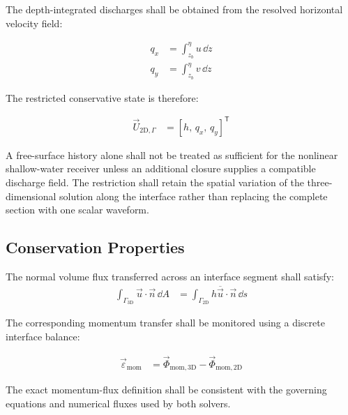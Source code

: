The depth-integrated discharges shall be obtained from the resolved
horizontal velocity field:

\begin{align}
    q_x
    &=
    \int_{z_b}^{\eta}
    u\,\dd z
    \label{eq:res-num-ibc-restricted-discharge-x}
    \\
    q_y
    &=
    \int_{z_b}^{\eta}
    v\,\dd z
    \label{eq:res-num-ibc-restricted-discharge-y}
\end{align}

The restricted conservative state is therefore:

\begin{align}
    \vec{U}_{\mathrm{2D},\Gamma}
    &=
    \left[
        h,\,
        q_x,\,
        q_y
    \right]^{\mathsf{T}}
    \label{eq:res-num-ibc-restricted-conservative-state}
\end{align}

A free-surface history alone shall not be treated as sufficient for the
nonlinear shallow-water receiver unless an additional closure supplies
a compatible discharge field. The restriction shall retain the spatial
variation of the three-dimensional solution along the interface rather
than replacing the complete section with one scalar waveform.

\subsection{Conservation Properties}
\label{sec:res-num-ibc-conservation-properties}


The normal volume flux transferred across an interface segment shall satisfy:
\begin{align}
    \int_{\Gamma_{\mathrm{3D}}} \vec{u}\cdot\vec{n}\,\dd A &= \int_{\Gamma_{\mathrm{2D}}} h\overline{\vec{u}}\cdot\vec{n}\,\dd s
    \label{eq:res-num-ibc-interface-volume-flux}
\end{align}

The corresponding momentum transfer shall be monitored using a discrete interface balance:

\begin{align}
    \vec{\varepsilon}_{\mathrm{mom}} &= \vec{\Phi}_{\mathrm{mom},\mathrm{3D}} - \vec{\Phi}_{\mathrm{mom},\mathrm{2D}}
    \label{eq:res-num-ibc-interface-momentum-imbalance}
\end{align}

The exact momentum-flux definition shall be consistent with the governing equations and numerical fluxes used by both solvers.

